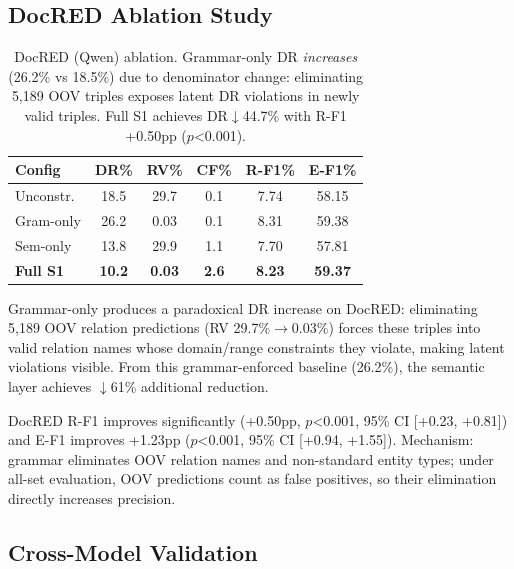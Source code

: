 \documentclass[11pt]{article}
\begin{document}
\subsection{DocRED Ablation Study}
\label{sec:docred}

\begin{table}[t]
\centering
\small
\begin{tabular}{lccccc}
\toprule
\textbf{Config} & \textbf{DR\%} & \textbf{RV\%} & \textbf{CF\%} & \textbf{R-F1\%} & \textbf{E-F1\%} \\
\midrule
Unconstr. & 18.5 & 29.7 & 0.1 & 7.74 & 58.15 \\
Gram-only & 26.2 & 0.03 & 0.1 & 8.31 & 59.38 \\
Sem-only & 13.8 & 29.9 & 1.1 & 7.70 & 57.81 \\
\textbf{Full S1} & \textbf{10.2} & \textbf{0.03} & \textbf{2.6} & \textbf{8.23} & \textbf{59.37} \\
\bottomrule
\end{tabular}
\caption{DocRED (Qwen) ablation. Grammar-only DR \emph{increases} (26.2\% vs 18.5\%) due to denominator change: eliminating 5,189 OOV triples exposes latent DR violations in newly valid triples. Full S1 achieves DR$\downarrow$44.7\% with R-F1 +0.50pp ($p$<0.001).}
\label{tab:docred}
\end{table}

Grammar-only produces a paradoxical DR increase on DocRED: eliminating 5,189 OOV relation predictions (RV 29.7\%$\to$0.03\%) forces these triples into valid relation names whose domain/range constraints they violate, making latent violations visible. From this grammar-enforced baseline (26.2\%), the semantic layer achieves $\downarrow$61\% additional reduction.

DocRED R-F1 improves significantly (+0.50pp, $p$<0.001, 95\% CI [+0.23, +0.81]) and E-F1 improves +1.23pp ($p$<0.001, 95\% CI [+0.94, +1.55]). Mechanism: grammar eliminates OOV relation names and non-standard entity types; under all-set evaluation, OOV predictions count as false positives, so their elimination directly increases precision.

\subsection{Cross-Model Validation}
\label{sec:cross}
\end{document}
